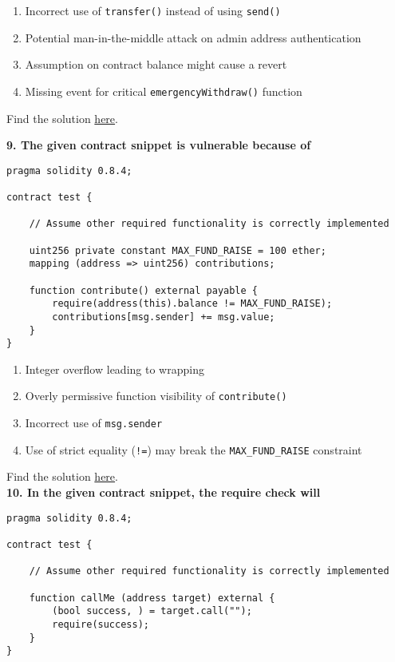 \begin{enumerate}[label=\Alph*.]
    \item Incorrect use of \verb|transfer()| instead of using \verb|send()|
    \item Potential man-in-the-middle attack on admin address authentication
    \item Assumption on contract balance might cause a revert
    \item Missing event for critical \verb|emergencyWithdraw()| function
\end{enumerate}

Find the solution \hyperref[sec:exam4_q8]{here}.\\

\pagebreak

\textbf{9. The given contract snippet is vulnerable because of}

\begin{lstlisting}[language=Solidity, style=solStyle]
pragma solidity 0.8.4;

contract test {

    // Assume other required functionality is correctly implemented

    uint256 private constant MAX_FUND_RAISE = 100 ether;
    mapping (address => uint256) contributions;

    function contribute() external payable {
        require(address(this).balance != MAX_FUND_RAISE);
        contributions[msg.sender] += msg.value;
    }
}
\end{lstlisting}

\begin{enumerate}[label=\Alph*.]
    \item Integer overflow leading to wrapping
    \item Overly permissive function visibility of \verb|contribute()|
    \item Incorrect use of \verb|msg.sender|
    \item Use of strict equality (\verb|!=|) may break the \verb|MAX_FUND_RAISE| constraint
\end{enumerate}

Find the solution \hyperref[sec:exam4_q9]{here}.\\

\textbf{10. In the given contract snippet, the require check will}

\begin{lstlisting}[language=Solidity, style=solStyle]
pragma solidity 0.8.4;

contract test {

    // Assume other required functionality is correctly implemented

    function callMe (address target) external {
        (bool success, ) = target.call("");
        require(success);
    }
}
\end{lstlisting}

